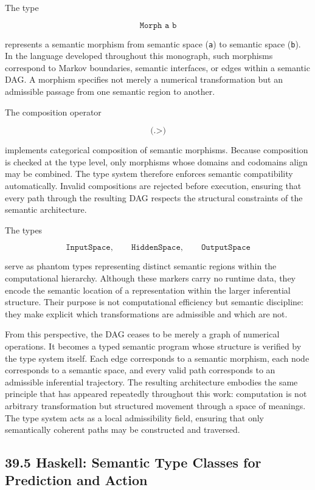 \documentclass[12pt,letterpaper]{article}
\theoremstyle{remark}
\begin{document}
The type

\[
\texttt{Morph a b}
\]

represents a semantic morphism from semantic space (\texttt{a}) to semantic space (\texttt{b}). In the language developed throughout this monograph, such morphisms correspond to Markov boundaries, semantic interfaces, or edges within a semantic DAG. A morphism specifies not merely a numerical transformation but an admissible passage from one semantic region to another.

The composition operator

\[
\texttt{(.>)}
\]

implements categorical composition of semantic morphisms. Because composition is checked at the type level, only morphisms whose domains and codomains align may be combined. The type system therefore enforces semantic compatibility automatically. Invalid compositions are rejected before execution, ensuring that every path through the resulting DAG respects the structural constraints of the semantic architecture.

The types

\[
\texttt{InputSpace}, \qquad
\texttt{HiddenSpace}, \qquad
\texttt{OutputSpace}
\]

serve as phantom types representing distinct semantic regions within the computational hierarchy. Although these markers carry no runtime data, they encode the semantic location of a representation within the larger inferential structure. Their purpose is not computational efficiency but semantic discipline: they make explicit which transformations are admissible and which are not.

From this perspective, the DAG ceases to be merely a graph of numerical operations. It becomes a typed semantic program whose structure is verified by the type system itself. Each edge corresponds to a semantic morphism, each node corresponds to a semantic space, and every valid path corresponds to an admissible inferential trajectory. The resulting architecture embodies the same principle that has appeared repeatedly throughout this work: computation is not arbitrary transformation but structured movement through a space of meanings. The type system acts as a local admissibility field, ensuring that only semantically coherent paths may be constructed and traversed.

\subsection{39.5 Haskell: Semantic Type Classes for Prediction and Action}
\end{document}
